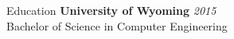 \documentclass{resume} %
\begin{document}
	
	
	\begin{rSection}{Education}
		{\bf University of Wyoming} \hfill {\em 2015} 
		\\ Bachelor of Science in Computer Engineering
	\end{rSection}

\end{document}
